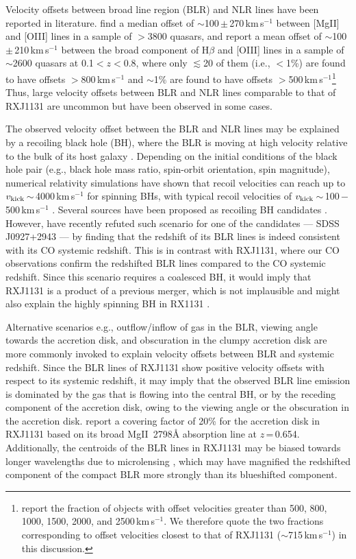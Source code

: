 \documentclass[]{emulateapj}
\newcommand{\mgii}{\mbox{Mg{\scriptsize II}~2798\AA}\xspace}
\newcommand{\kms}{\mbox{km\,s$^{-1}$}\xspace}
\newcommand{\eq}{\,=\,}
\newcommand{\ssim}{\,$\sim$\,}
\newcommand{\pmm}{\,$\pm$\,}
\newcommand{\eg}{{e.g.,~}}
\begin{document}
Velocity offsets between broad line region (BLR) and NLR lines have been reported in literature.
\citet{Richards02a} find a median offset of
$\sim$100\pmm270\,\kms
between [Mg{\scriptsize II}] and [O{\scriptsize III}] lines in a
sample of $>$3800 quasars,
and \citet{Bonning07a} report
a mean offset of
$\sim$100\pmm210\,\kms
between the broad component of
H$\beta$ and [O{\scriptsize III}] lines in a sample of $\sim$2600 quasars at 0.1$<$$z$$<$0.8,
where only $\lesssim$20 of them (i.e., $<$1\%) are found to have offsets $>$800\,\kms
and $\sim$1\%
are found to have offsets $>$500\,\kms \footnote{\citet{Bonning07a} report the fraction of objects with offset velocities greater
than 500, 800, 1000, 1500, 2000, and 2500\,\kms. We therefore quote the two fractions corresponding to
offset velocities closest
to that of RXJ1131 ($\sim$715\,\kms) in this discussion.}
Thus, large velocity offsets between BLR and NLR lines
comparable to that of RXJ1131 are uncommon but have been observed in some cases.

The observed velocity offset between the BLR and NLR lines may be explained by
a recoiling black hole (BH),
where the BLR is moving at high velocity relative to the bulk of its host galaxy
\citep{Madau04a, Bonning07a, Loeb07a}.
Depending on the initial conditions of the black hole pair (e.g., black hole mass ratio, spin-orbit orientation, spin magnitude),
numerical relativity simulations have shown that recoil velocities can reach up to
$v_{\rm kick}$\ssim4000\,\kms for spinning BHs,
with typical recoil velocities of $v_{\rm kick}$\ssim100\,$-$\,500\,\kms
\citep[\eg][]{Libeskind06a,Campanelli07a}.
Several sources have been proposed as recoiling BH candidates \citep[][]{Komossa08a, Civano10a, Steinhardt12a}.
However, \citet{Decarli14a} have recently refuted
such scenario for one of the candidates --- SDSS J0927+2943 --- by finding that the redshift of its
BLR lines is indeed consistent with its CO systemic redshift.
This is in contrast with RXJ1131, where our CO observations confirm
the redshifted BLR lines compared to the CO systemic redshift.
Since this scenario requires a coalesced BH, it would imply that RXJ1131
is a product of a previous merger, which is not implausible and
might also explain the highly spinning BH in RX1131 \citep[$a$\ssim0.9;][]{Reis14a}.

Alternative scenarios
e.g., outflow/inflow of gas in the BLR, viewing angle towards the accretion disk, and
obscuration in the clumpy accretion disk
are more commonly invoked to explain velocity offsets between BLR and systemic redshift.
Since the BLR lines of RXJ1131 show positive velocity offsets with respect to its systemic redshift, it may imply that
the observed
BLR line emission is dominated by the gas that is flowing into the central BH, or by the receding component of
the accretion disk, owing to the viewing angle or the obscuration in the accretion disk.
\citet{Sluse07a} report a covering factor of 20\% for the accretion disk in RXJ1131
based on its broad \mgii absorption line at $z$\eq0.654.
Additionally, the centroids of the BLR lines in RXJ1131 may be biased towards longer wavelengths due to
microlensing \citep[\eg][]{Sluse07a, Sluse12a}, which may have
magnified the redshifted component of the compact BLR more strongly than its blueshifted component.
\end{document}
